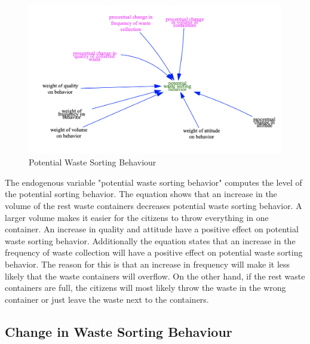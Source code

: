 \begin{figure}[H]
\centering
\includegraphics [scale=0.34,angle=360]{figures/potentialbehaviour.png}
\caption{Potential Waste Sorting Behaviour}
\label{fig:potentialbehaviour}
\end{figure}

\indent \newline
The endogenous variable "potential waste sorting behavior" computes the level of the potential sorting behavior. The equation shows that an increase in the volume of the rest waste containers decreases potential waste sorting behavior. A larger volume makes it easier for the citizens to throw everything in one container. An increase in quality and attitude  have a positive effect on potential waste sorting behavior. Additionally the equation states that an increase in the frequency of waste collection will have a positive effect on potential waste sorting behavior. The reason for this is that an increase in frequency will make it less likely that the waste containers will overflow. On the other hand, if the rest waste containers are full, the citizens will most likely throw the waste in the wrong container or just leave the waste next to the containers. 

\subsection{Change in Waste Sorting Behaviour}

